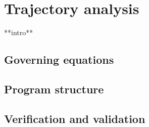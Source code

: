 \section{Trajectory analysis} \label{ch:trajectory}

**intro**

\subsection{Governing equations}

\subsection{Program structure}

\subsection{Verification and validation}